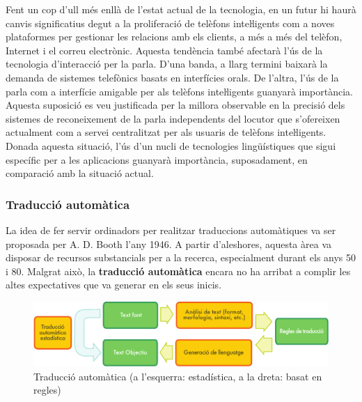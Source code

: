 \begin{multicols}{2}
Fent un cop d’ull més enllà de l’estat actual de la tecnologia, en un futur hi haurà canvis significatius degut a la proliferació de telèfons inteŀligents com a noves plataformes per gestionar les relacions amb els clients, a més a més del telèfon, Internet i el correu electrònic. Aquesta tendència també afectarà l’ús de la tecnologia d’interacció per la parla. D’una banda, a llarg termini baixarà la demanda de sistemes telefònics basats en interfícies orals. De l’altra, l’ús de la parla com a interfície amigable per als telèfons inteŀligents guanyarà importància. Aquesta suposició es veu justificada per la millora observable en la precisió dels sistemes de reconeixement de la parla independents del locutor que s’ofereixen actualment com a servei centralitzat per als usuaris de telèfons inteŀligents. Donada aquesta situació, l’ús d’un nucli de tecnologies lingüístiques que sigui específic per a les aplicacions guanyarà importància, suposadament, en comparació amb la situació actual. 

\subsubsection{Traducció automàtica}

La idea de fer servir ordinadors per realitzar traduccions automàtiques va ser proposada per A. D. Booth l’any 1946. A partir d’aleshores, aquesta àrea va disposar de recursos substancials per a la recerca, especialment durant els anys 50 i 80. Malgrat això, la \textbf{traducció automàtica} encara no ha arribat a complir les altes expectatives que va generar en els seus inicis.  

\begin{figure}[htb]
  \center
  \includegraphics[width=\textwidth]{../_media/catalan/machine_translation}
  \vspace{-2mm}
  \caption{Traducció automàtica (a l'esquerra: estadística, a la dreta: basat en regles)}
  \label{fig:mtarch_ca}
\end{figure}


\end{multicols}
